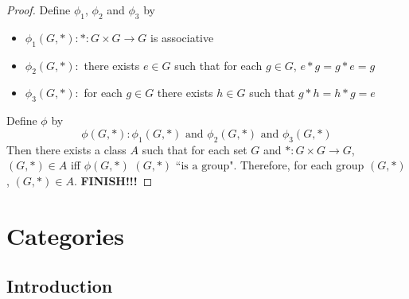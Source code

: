 \documentclass{book}
\begin{document}
	\begin{proof}
		Define $\phi_1$, $\phi_2$ and $\phi_3$ by 
		\begin{itemize}
			\item $\phi_1(G, *): *:G \times G \rightarrow G$ is associative
			\item $\phi_2(G, *):$ there exists $e \in G$ such that for each $g \in G$, $e * g = g * e = g$
			\item $\phi_3(G, *):$ for each $g \in G$ there exists $h \in G$ such that $g * h = h * g = e$
		\end{itemize}
		Define $\phi$ by 
		$$\phi(G, *) : \phi_1(G, *) \text{ and } \phi_2(G, *) \text{ and } \phi_3(G, *)$$
		Then there exists a class $A$ such that for each set $G$ and  $*: G \times G \rightarrow G$, $(G, *) \in A$ iff $\phi(G, *)$ $(G, *) \text{ ``is a group"}$. Therefore, for each group $(G, *)$, $(G, *) \in A$.
		\textbf{FINISH!!!}
	\end{proof}

	
	
	
	
	
	
	
	
	
	
	
	
	
	
	
	
	
	
	
	
	
	
	
	
	
	
	
	
	
	
	
	
	
	
	
	\newpage
	\section{Categories}
	
	\subsection{Introduction}
	
\end{document}
